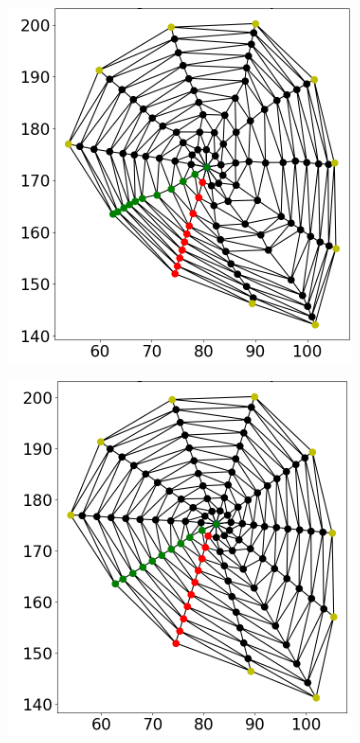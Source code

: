 \begin{figure}
\begin{subfigure}[t]{0.24\textwidth}
    \label{fig:tri_00}%
  \end{subfigure}
  \begin{subfigure}[t]{0.24\textwidth}%
    \centering%
    \includegraphics[width=\textwidth, trim=26mm 14mm 6mm 6mm, clip]{images/fiber_creation/mesh_plots/out_1_0_0_w.png}%
    \label{fig:tri_10}%
  \end{subfigure}
  \begin{subfigure}[t]{0.24\textwidth}%
    \centering%
    \includegraphics[width=\textwidth, trim=30mm 14mm 6mm 6mm, clip]{images/fiber_creation/mesh_plots/out_2_0_0_w.png}%
    \label{fig:tri_20}%
  \end{subfigure}\\[-4mm]
  

\end{figure}
